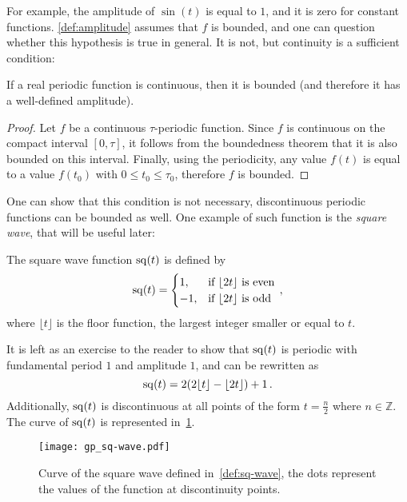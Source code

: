 \noindent For example, the amplitude of $\sin(t)$ is equal to $1$, and it is zero for
constant functions. \cref{def:amplitude} assumes that $f$ is bounded, and one can question
whether this hypothesis is true in general. It is not, but continuity is a sufficient
condition:
\begin{proposition}
  If a real periodic function is continuous, then it is bounded (and therefore it has a
  well-defined amplitude).
\end{proposition}
\begin{proof}
  Let $f$ be a continuous $\tau$-periodic function. Since $f$ is continuous on the compact
  interval $[0,\tau]$, it follows from the boundedness theorem that it is also bounded on
  this interval. Finally, using the periodicity, any value $f(t)$ is equal to a value
  $f(t_0)$ with $0\leq t_0\leq \tau_0$, therefore $f$ is bounded.
\end{proof}
\noindent One can show that this condition is not necessary, \ie discontinuous periodic
functions can be bounded as well. One example of such function is the \emph{square wave},
that will be useful later:
\begin{definition}
  \label{def:sq-wave}
  The square wave function $\operatorname{sq}(t)$ is defined by
  \begin{equation}
    \operatorname{sq}(t)=
    \begin{cases}
      1, &\text{if~}\lfloor 2t\rfloor~\text{is even}\\
      -1, &\text{if~}\lfloor 2t\rfloor~\text{is odd}\\
    \end{cases}\,,
    \label{eq:wave-square}
  \end{equation}
  where $\lfloor t\rfloor$ is the floor function, \ie the largest integer smaller or equal
  to $t$.
\end{definition}
\noindent It is left as an exercise to the reader to show that $\operatorname{sq}(t)$ is periodic with
fundamental period $1$ and amplitude $1$, and can be rewritten as
\begin{equation}
  \operatorname{sq}(t)=2(2\lfloor t\rfloor-\lfloor 2t\rfloor)+1\,.
\end{equation}
Additionally, $\operatorname{sq}(t)$ is discontinuous at all points of the form $t=\frac{n}{2}$ where
$n\in\mathbb{Z}$. The curve of $\operatorname{sq}(t)$ is represented in~\cref{fig:sq-wave}.
\begin{figure}[t]
  \centering
  \texttt{[image: gp\_sq-wave.pdf]}
  \caption{Curve of the square wave defined in~\cref{def:sq-wave}, the dots represent
  the values of the function at discontinuity points.}
  \label{fig:sq-wave}
\end{figure}

